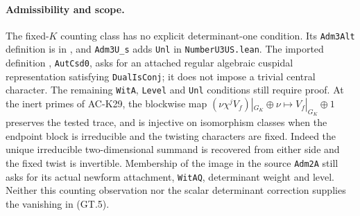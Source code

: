 \paragraph{Admissibility and scope.}
The fixed-$K$ counting class has no explicit determinant-one
condition.  Its \texttt{Adm3Alt} definition is in
,
and \texttt{Adm3U\_s} adds \texttt{Unl} in \texttt{NumberU3US.lean}.
The imported definition
,
\texttt{AutCsd0}, asks for an attached regular algebraic cuspidal
representation satisfying \texttt{DualIsConj}; it does not impose
a trivial central character.  The remaining \texttt{WitA},
\texttt{Level} and \texttt{Unl} conditions still require proof.
At the inert primes of AC-K29, the blockwise map
$(\nu\chi^j V_f)|_{G_K}\oplus\nu\mapsto V_f|_{G_K}\oplus1$
preserves the tested trace, and is injective on isomorphism classes
when the endpoint block is irreducible and the twisting characters
are fixed.  Indeed the unique irreducible two-dimensional summand
is recovered from either side and the fixed twist is invertible.
Membership of the image in the source \texttt{Adm2A} still asks
for its actual newform attachment, \texttt{WitAQ}, determinant
weight and level.  Neither this counting observation nor the
scalar determinant correction supplies the vanishing in (GT.5).
